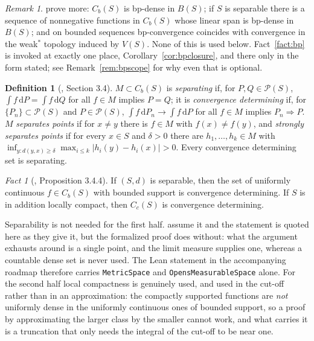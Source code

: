 \documentclass[11pt,a4paper]{article}
\theoremstyle{plain}
\theoremstyle{definition}
\newtheorem{definition}[theorem]{Definition}
\theoremstyle{remark}
\newtheorem{remark}[theorem]{Remark}
\newtheorem{fact}[theorem]{Fact}
\newcommand{\Bdd}{B}                           %
\newcommand{\Cb}{C_b}                          %
\newcommand{\Prob}{\mathcal{P}}                %
\newcommand{\dif}{\,\mathrm{d}}
\newcommand{\Vsig}{V}                          %
\DeclareMathOperator*{\wto}{\Rightarrow}
\newcommand{\EK}{\cite{EK86}}
\begin{document}
\begin{remark}
  \label{rem:bpunused}
  \EK{} prove more: $\Cb(S)$ is bp-dense in $\Bdd(S)$; if $S$ is separable there
  is a sequence of nonnegative functions in $\Cb(S)$ whose linear span is
  bp-dense in $\Bdd(S)$; and on bounded sequences bp-convergence coincides with
  convergence in the weak$^*$ topology induced by $\Vsig(S)$.  None of this is
  used below.  Fact~\ref{fact:bp} is invoked at exactly one place,
  Corollary~\ref{cor:bpclosure}, and there only in the form stated; see
  Remark~\ref{rem:bpscope} for why even that is optional.
\end{remark}

\begin{definition}[\EK, Section 3.4]
  \label{def:separating}
  $M \subset \Cb(S)$ is \emph{separating} if, for $P,Q \in \Prob(S)$,
  $\int f \dif P = \int f \dif Q$ for all $f \in M$ implies $P = Q$; it is
  \emph{convergence determining} if, for $\{P_n\} \subset \Prob(S)$ and
  $P \in \Prob(S)$, $\int f \dif P_n \to \int f \dif P$ for all $f \in M$
  implies $P_n \wto P$.  $M$ \emph{separates points} if for $x \neq y$ there is
  $f \in M$ with $f(x) \neq f(y)$, and \emph{strongly separates points} if for
  every $x \in S$ and $\delta > 0$ there are $h_1,\dots,h_k \in M$ with
  $\inf_{y : d(y,x) \geq \delta} \max_{i \leq k} |h_i(y) - h_i(x)| > 0$.
  Every convergence determining set is separating.
\end{definition}

\begin{fact}[\EK, Proposition 3.4.4]
  \label{fact:convdet}
  If $(S,d)$ is separable, then the set of uniformly continuous $f \in \Cb(S)$
  with bounded support is convergence determining.  If $S$ is in addition
  locally compact, then $C_c(S)$ is convergence determining.

  Separability is not needed for the first half.  \EK{} assume it and the
  statement is quoted here as they give it, but the formalized proof does
  without: what the argument exhausts around is a single point, and the limit
  measure supplies one, whereas a countable dense set is never used.  The Lean
  statement in the accompanying roadmap therefore carries
  \texttt{MetricSpace} and \texttt{OpensMeasurableSpace} alone.  For the second
  half local compactness is genuinely used, and used in the cut-off rather than
  in an approximation: the compactly supported functions are \emph{not} uniformly
  dense in the uniformly continuous ones of bounded support, so a proof by
  approximating the larger class by the smaller cannot work, and what carries it
  is a truncation that only needs the integral of the cut-off to be near one.
\end{fact}
\end{document}
